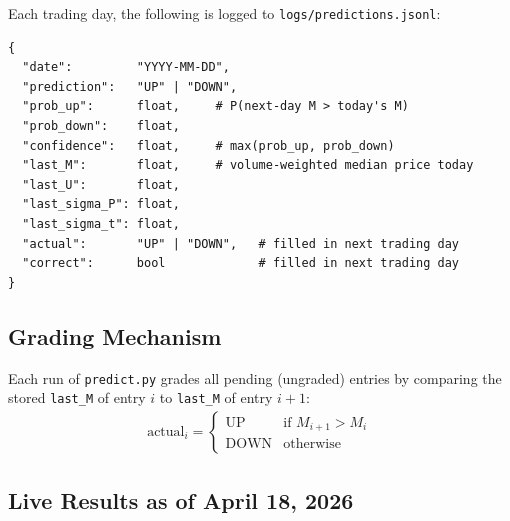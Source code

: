 \documentclass[preprint,12pt]{elsarticle}
\begin{document}
Each trading day, the following is logged to \texttt{logs/predictions.jsonl}:
\begin{lstlisting}
{
  "date":         "YYYY-MM-DD",
  "prediction":   "UP" | "DOWN",
  "prob_up":      float,     # P(next-day M > today's M)
  "prob_down":    float,
  "confidence":   float,     # max(prob_up, prob_down)
  "last_M":       float,     # volume-weighted median price today
  "last_U":       float,
  "last_sigma_P": float,
  "last_sigma_t": float,
  "actual":       "UP" | "DOWN",   # filled in next trading day
  "correct":      bool             # filled in next trading day
}
\end{lstlisting}

\subsection{Grading Mechanism}

Each run of \texttt{predict.py} grades all pending (ungraded) entries by comparing the stored \texttt{last\_M} of entry $i$ to \texttt{last\_M} of entry $i+1$:
\begin{align}
    \mathrm{actual}_i = \begin{cases} \mathrm{UP} & \text{if } M_{i+1} > M_i \\ \mathrm{DOWN} & \text{otherwise} \end{cases}
\end{align}

\subsection{Live Results as of April 18, 2026}

\begin{table}[htbp]
\centering
\caption{Full prediction log as of April 18, 2026}
\end{table}
\end{document}
